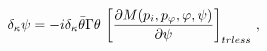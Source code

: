 \begin{equation}\label{psi}
\delta_\kappa\psi=-i\delta_\kappa\bar\theta\Gamma\theta\,
\left[{{\partial M(p_i,p_{\varphi},\varphi,\psi)}\over{\partial
\psi}}\right]_{trless}\,,
\end{equation}

